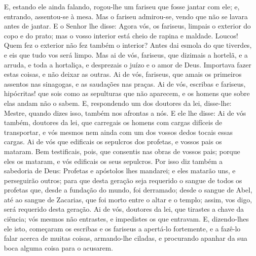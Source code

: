 E, estando ele ainda falando, rogou-lhe um fariseu que fosse
jantar com ele; e, entrando, assentou-se à mesa. Mas o
fariseu admirou-se, vendo que não se lavara antes de jantar.
E o Senhor lhe disse: Agora vós, os fariseus, limpais o
exterior do copo e do prato; mas o vosso interior está cheio de
rapina e maldade. Loucos! Quem fez o exterior não fez também
o interior? Antes dai esmola do que tiverdes, e eis que tudo
vos será limpo. Mas ai de vós, fariseus, que dizimais a
hortelã, e a arruda, e toda a hortaliça, e desprezais o juízo e o
amor de Deus. Importava fazer estas coisas, e não deixar as outras.
Ai de vós, fariseus, que amais os primeiros assentos nas
sinagogas, e as saudações nas praças. Ai de vós, escribas e
fariseus, hipócritas! que sois como as sepulturas que não aparecem,
e os homens que sobre elas andam não o sabem. E, respondendo
um dos doutores da lei, disse-lhe: Mestre, quando dizes isso, também
nos afrontas a nós. E ele lhe disse: Ai de vós também,
doutores da lei, que carregais os homens com cargas difíceis de
transportar, e vós mesmos nem ainda com um dos vossos dedos tocais
essas cargas. Ai de vós que edificais os sepulcros dos
profetas, e vossos pais os mataram. Bem testificais, pois,
que consentis nas obras de vossos pais; porque eles os mataram, e
vós edificais os seus sepulcros. Por isso diz também a
sabedoria de Deus: Profetas e apóstolos lhes mandarei; e eles
matarão uns, e perseguirão outros; para que desta geração
seja requerido o sangue de todos os profetas que, desde a fundação
do mundo, foi derramado; desde o sangue de Abel, até ao
sangue de Zacarias, que foi morto entre o altar e o templo; assim,
vos digo, será requerido desta geração. Ai de vós, doutores
da lei, que tirastes a chave da ciência; vós mesmos não entrastes, e
impedistes os que entravam. E, dizendo-lhes ele isto,
começaram os escribas e os fariseus a apertá-lo fortemente, e a
fazê-lo falar acerca de muitas coisas, armando-lhe ciladas, e
procurando apanhar da sua boca alguma coisa para o acusarem.

\medskip

